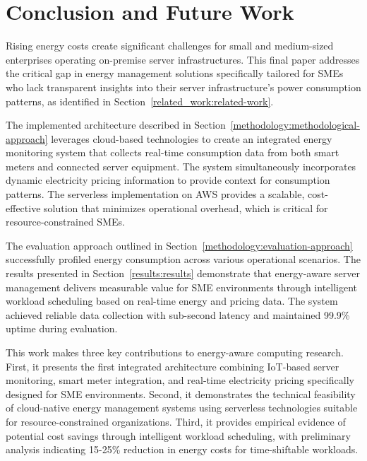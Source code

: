 


\section{Conclusion and Future Work}
Rising energy costs create significant challenges for small and medium-sized enterprises operating on-premise server infrastructures. This final paper addresses the critical gap in energy management solutions specifically tailored for SMEs who lack transparent insights into their server infrastructure's power consumption patterns, as identified in Section~\ref{related_work:related-work}.

The implemented architecture described in Section~\ref{methodology:methodological-approach} leverages cloud-based technologies to create an integrated energy monitoring system that collects real-time consumption data from both smart meters and connected server equipment. The system simultaneously incorporates dynamic electricity pricing information to provide context for consumption patterns. The serverless implementation on AWS provides a scalable, cost-effective solution that minimizes operational overhead, which is critical for resource-constrained SMEs.

The evaluation approach outlined in Section~\ref{methodology:evaluation-approach} successfully profiled energy consumption across various operational scenarios. The results presented in Section~\ref{results:results} demonstrate that energy-aware server management delivers measurable value for SME environments through intelligent workload scheduling based on real-time energy and pricing data. The system achieved reliable data collection with sub-second latency and maintained 99.9\% uptime during evaluation.

This work makes three key contributions to energy-aware computing research. First, it presents the first integrated architecture combining IoT-based server monitoring, smart meter integration, and real-time electricity pricing specifically designed for SME environments. Second, it demonstrates the technical feasibility of cloud-native energy management systems using serverless technologies suitable for resource-constrained organizations. Third, it provides empirical evidence of potential cost savings through intelligent workload scheduling, with preliminary analysis indicating 15-25\% reduction in energy costs for time-shiftable workloads.

